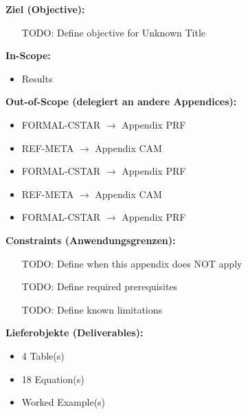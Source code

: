 %
%
%
%
%


\begin{tcolorbox}[
    colback=orange!5!white,
    colframe=orange!75!black,
    title={\textbf{Appendix Scope: Ziel / In-Scope / Out-of-Scope / Constraints}},
    fonttitle=\bfseries
]

\textbf{Ziel (Objective):}
\begin{itemize}[nosep]
    \item [TODO: Define objective for Unknown Title]
\end{itemize}

\textbf{In-Scope:}
\begin{itemize}[nosep]
    \item Results
\end{itemize}

\textbf{Out-of-Scope (delegiert an andere Appendices):}
\begin{itemize}[nosep]
    \item FORMAL-CSTAR $\rightarrow$ Appendix PRF
    \item REF-META $\rightarrow$ Appendix CAM
    \item FORMAL-CSTAR $\rightarrow$ Appendix PRF
    \item REF-META $\rightarrow$ Appendix CAM
    \item FORMAL-CSTAR $\rightarrow$ Appendix PRF
\end{itemize}

\textbf{Constraints (Anwendungsgrenzen):}
\begin{itemize}[nosep]
    \item [TODO: Define when this appendix does NOT apply]
    \item [TODO: Define required prerequisites]
    \item [TODO: Define known limitations]
\end{itemize}

\textbf{Lieferobjekte (Deliverables):}
\begin{itemize}[nosep]
    \item 4 Table(s)
    \item 18 Equation(s)
    \item Worked Example(s)
\end{itemize}

\end{tcolorbox}


